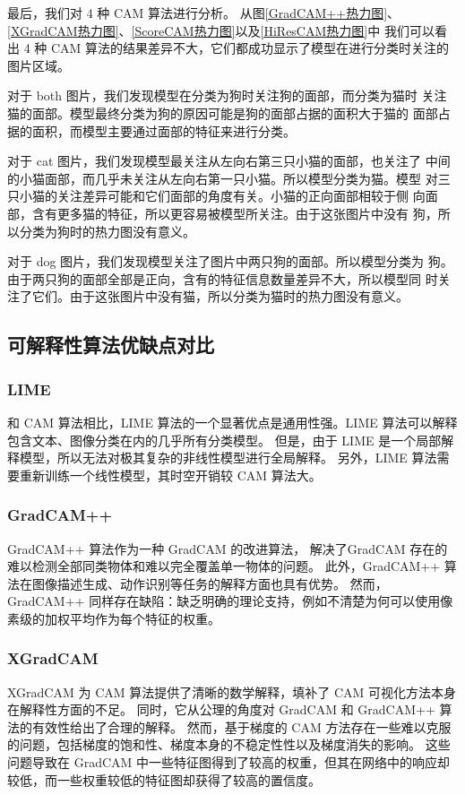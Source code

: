 \documentclass[supercite]{Experimental_Report}
\theoremstyle{definition}
\begin{document}
最后，我们对 4 种 CAM 算法进行分析。
从图\ref{GradCAM++热力图}、\ref{XGradCAM热力图}、\ref{ScoreCAM热力图}以及\ref{HiResCAM热力图}中
我们可以看出 4 种 CAM 算法的结果差异不大，它们都成功显示了模型在进行分类时关注的图片区域。

对于 both 图片，我们发现模型在分类为狗时关注狗的面部，而分类为猫时
关注猫的面部。模型最终分类为狗的原因可能是狗的面部占据的面积大于猫的
面部占据的面积，而模型主要通过面部的特征来进行分类。

对于 cat 图片，我们发现模型最关注从左向右第三只小猫的面部，也关注了
中间的小猫面部，而几乎未关注从左向右第一只小猫。所以模型分类为猫。模型
对三只小猫的关注差异可能和它们面部的角度有关。小猫的正向面部相较于侧
向面部，含有更多猫的特征，所以更容易被模型所关注。由于这张图片中没有
狗，所以分类为狗时的热力图没有意义。

对于 dog 图片，我们发现模型关注了图片中两只狗的面部。所以模型分类为
狗。由于两只狗的面部全部是正向，含有的特征信息数量差异不大，所以模型同
时关注了它们。由于这张图片中没有猫，所以分类为猫时的热力图没有意义。
\subsection{可解释性算法优缺点对比}
\subsubsection{LIME}
和 CAM 算法相比，LIME 算法的一个显著优点是通用性强。LIME 算法可以解释包含文本、图像分类在内的几乎所有分类模型。
但是，由于 LIME 是一个局部解释模型，所以无法对极其复杂的非线性模型进行全局解释。
另外，LIME 算法需要重新训练一个线性模型，其时空开销较 CAM 算法大。

\subsubsection{GradCAM++}
GradCAM++ 算法作为一种 GradCAM 的改进算法，
解决了GradCAM 存在的难以检测全部同类物体和难以完全覆盖单一物体的问题。
此外，GradCAM++ 算法在图像描述生成、动作识别等任务的解释方面也具有优势。
然而，GradCAM++ 同样存在缺陷：缺乏明确的理论支持，例如不清楚为何可以使用像素级的加权平均作为每个特征的权重。

\subsubsection{XGradCAM}
XGradCAM 为 CAM 算法提供了清晰的数学解释，填补了 CAM 可视化方法本身在解释性方面的不足。
同时，它从公理的角度对 GradCAM 和 GradCAM++ 算法的有效性给出了合理的解释。
然而，基于梯度的 CAM 方法存在一些难以克服的问题，包括梯度的饱和性、梯度本身的不稳定性性以及梯度消失的影响。
这些问题导致在 GradCAM 中一些特征图得到了较高的权重，但其在网络中的响应却较低，而一些权重较低的特征图却获得了较高的置信度。
\end{document}
